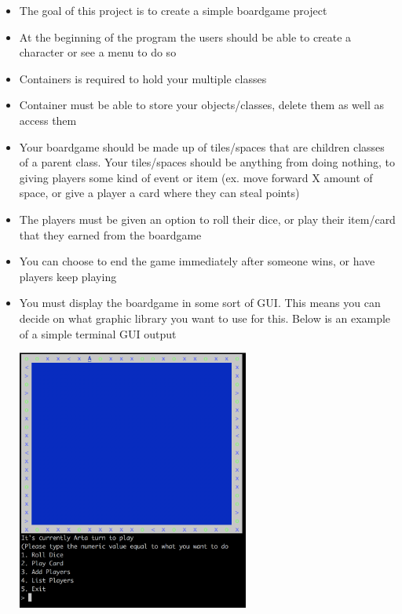 \documentclass{42-en}
\begin{document}

	\begin{itemize}

		\item The goal of this project is to create a simple boardgame project
		\item At the beginning of the program the users should be able
		to create a character or see a menu to do so
		\item Containers is required to hold your multiple classes
		\item Container must be able to store your objects/classes, delete them as well as access them
		\item Your boardgame should be made up of tiles/spaces that are children classes
		of a parent class. Your tiles/spaces should be anything from doing nothing,
		to giving players some kind of event or item (ex. move forward X amount of space,
		or give a player a card where they can steal points)
		\item The players must be given an option to roll their dice, or play their
		item/card that they earned from the boardgame
		\item You can choose to end the game immediately after someone wins, or have
		players keep playing
		\item You must display the boardgame in some sort of GUI. This means
		you can decide on what graphic library you want to use for this. Below is
		an example of a simple terminal GUI output

		\begin{center}
			\includegraphics[width=0.6\textwidth]{images/boardgame.png}
		\end{center}


\end{itemize}
\end{document}
